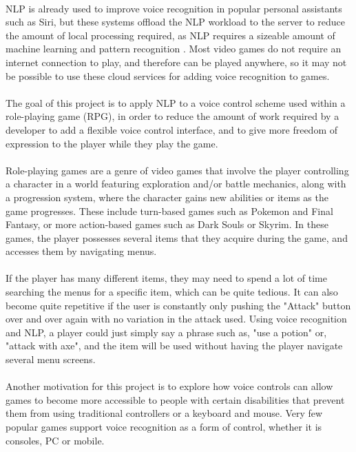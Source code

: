 \documentclass[12pt]{article}
\begin{document}
\\
NLP is already used to improve voice recognition in popular personal assistants such as Siri, but these systems offload the NLP workload to the server to reduce the amount of local processing required, as NLP requires a sizeable amount of machine learning and pattern recognition \cite{RefWorks:21}. Most video games do not require an internet connection to play, and therefore can be played anywhere, so it may not be possible to use these cloud services for adding voice recognition to games.
\\
\\
The goal of this project is to apply NLP to a voice control scheme used within a role-playing game (RPG), in order to reduce the amount of work required by a developer to add a flexible voice control interface, and to give more freedom of expression to the player while they play the game.
\\
\\
Role-playing games are a genre of video games that involve the player controlling a character in a world featuring exploration and/or battle mechanics, along with a progression system, where the character gains new abilities or items as the game progresses. These include turn-based games such as Pokemon and Final Fantasy, or more action-based games such as Dark Souls or Skyrim. In these games, the player possesses several items that they acquire during the game, and accesses them by navigating menus.
\\
\\
If the player has many different items, they may need to spend a lot of time searching the menus for a specific item, which can be quite tedious. It can also become quite repetitive if the user is constantly only pushing the "Attack" button over and over again with no variation in the attack used. Using voice recognition and NLP, a player could just simply say a phrase such as, "use a potion" or, "attack with axe", and the item will be used without having the player navigate several menu screens.
\\
\\
Another motivation for this project is to explore how voice controls can allow games to become more accessible to people with certain disabilities that prevent them from using traditional controllers or a keyboard and mouse. Very few popular games support voice recognition as a form of control, whether it is consoles, PC or mobile.
\\
\\
\end{document}
